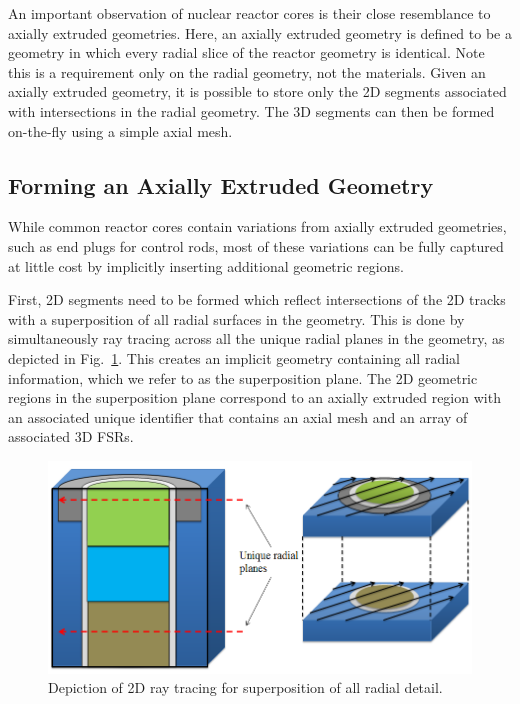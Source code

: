 An important observation of nuclear reactor cores is their close resemblance to axially extruded geometries. Here, an axially extruded geometry is defined to be a geometry in which every radial slice of the reactor geometry is identical. Note this is a requirement only on the radial geometry, not the materials. Given an axially extruded geometry, it is possible to store only the 2D segments associated with intersections in the radial geometry. The 3D segments can then be formed on-the-fly using a simple axial mesh.

\subsection{Forming an Axially Extruded Geometry}

While common reactor cores contain variations from axially extruded geometries, such as end plugs for control rods, most of these variations can be fully captured at little cost by implicitly inserting additional geometric regions.

First, 2D segments need to be formed which reflect intersections of the 2D tracks with a superposition of all radial surfaces in the geometry. This is done by simultaneously ray tracing across all the unique radial planes in the geometry, as depicted in Fig.~\ref{fig::superposition}. This creates an implicit geometry containing all radial information, which we refer to as the superposition plane. The 2D geometric regions in the superposition plane correspond to an axially extruded region with an associated unique identifier that contains an axial mesh and an array of associated 3D FSRs. 

\begin{figure}[ht!]
	\centering
	\includegraphics[width=\linewidth]{figures/ph2016/new_unique_z_levels_v_extruded_rt2.png}
	\caption{Depiction of 2D ray tracing for superposition of all radial detail.}
	\label{fig::superposition}
\end{figure}

